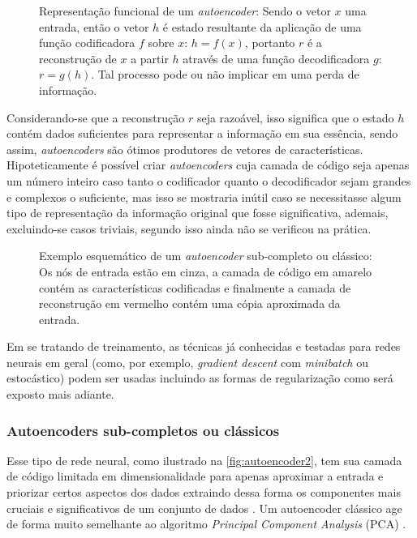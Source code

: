 			\begin{figure}[h]
				\centering
				\caption[Representação funcional de um autoencoder]{Representação funcional de um \textit{autoencoder}: Sendo o vetor $x$ uma entrada, então o vetor $h$ é estado resultante da aplicação de uma função codificadora $f$ sobre $x$: $h = f(x)$, portanto $r$ é a reconstrução de $x$ a partir $h$ através de uma função decodificadora $g$: $r = g(h)$. Tal processo pode ou não implicar em uma perda de informação.}
				
				\label{fig:autoencoder}
			\end{figure}
		
			\par Considerando-se que a reconstrução $r$ seja razoável, isso significa que o estado $h$ contém dados suficientes para representar a informação em sua essência, sendo assim, \textit{autoencoders} são ótimos produtores de vetores de características. Hipoteticamente é possível criar \textit{autoencoders} cuja camada de código seja apenas um número inteiro caso tanto o codificador quanto o decodificador sejam grandes e complexos o suficiente, mas isso se mostraria inútil caso se necessitasse algum tipo de representação da informação original que fosse significativa, ademais, excluindo-se casos triviais, segundo  isso ainda não se verificou na prática.

			\begin{figure}[h]
				\centering
				\caption[Exemplo esquemático de um autoencoder sub-completo]{Exemplo esquemático de um \textit{autoencoder} sub-completo ou clássico: Os nós de entrada estão em cinza, a camada de código em amarelo contém as características codificadas e finalmente a camada de reconstrução em vermelho contém uma cópia aproximada da entrada.}
				
				\label{fig:autoencoder2}
			\end{figure}

			\par Em se tratando de treinamento, as técnicas já conhecidas e testadas para redes neurais em geral (como, por exemplo, \textit{gradient descent} com \textit{minibatch} ou estocástico) podem ser usadas \cite{Goodfellow-et-al-2016} incluindo as formas de regularização como será exposto mais adiante.
			
			\subsubsection{Autoencoders sub-completos ou clássicos}
				\par Esse tipo de rede neural, como ilustrado na  \autoref{fig:autoencoder2}, tem sua camada de código limitada em dimensionalidade para apenas aproximar a entrada e priorizar certos aspectos dos dados extraindo dessa forma os componentes mais cruciais e significativos de um conjunto de dados \cite{Goodfellow-et-al-2016}. Um autoencoder clássico age de forma muito semelhante ao algoritmo
				\textit{Principal Component Analysis} (PCA) \cite{bengio2014representation}.
				  
